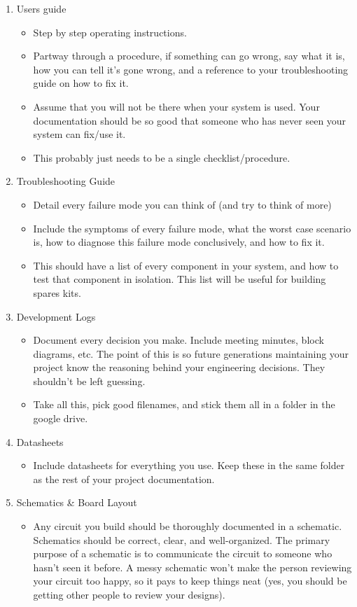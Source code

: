 \documentclass{article}
\begin{document}
\begin{enumerate}
\item Users guide
\begin{itemize}
\item Step by step operating instructions.
\item Partway through a procedure, if something can go wrong, say what it is, how you can tell it's gone wrong, and a reference to your troubleshooting guide on how to fix it.
\item Assume that you will not be there when your system is used. Your documentation should be so good that someone who has never seen your system can fix/use it.
\item This probably just needs to be a single checklist/procedure.
\end{itemize}
\item Troubleshooting Guide
\begin{itemize}
\item Detail every failure mode you can think of (and try to think of more)
\item Include the symptoms of every failure mode, what the worst case scenario is, how to diagnose this failure mode conclusively, and how to fix it.
\item This should have a list of every component in your system, and how to test that component in isolation. This list will be useful for building spares kits.
\end{itemize}
\item Development Logs
\begin{itemize}
\item Document every decision you make. Include meeting minutes, block diagrams, etc. The point of this is so future generations maintaining your project know the reasoning behind your engineering decisions. They shouldn't be left guessing.
\item Take all this, pick good filenames, and stick them all in a folder in the google drive.
\end{itemize}
\item Datasheets
\begin{itemize}
\item Include datasheets for everything you use. Keep these in the same folder as the rest of your project documentation.
\end{itemize}
\item Schematics \& Board Layout
\begin{itemize}
\item Any circuit you build should be thoroughly documented in a schematic. Schematics should be correct, clear, and well-organized. The primary purpose of a schematic is to communicate the circuit to someone who hasn't seen it before. A messy schematic won't make the person reviewing your circuit too happy, so it pays to keep things neat (yes, you should be getting other people to review your designs). 

\end{itemize}
\end{enumerate}
\end{document}

